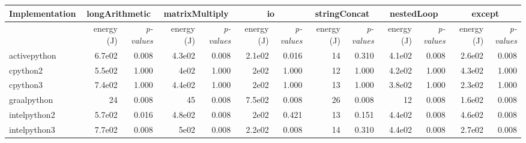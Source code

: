 \begin{table*}
{\begin{tabular}{l|rr|rr|rr|rr|rr|rr}
            Implementation & \multicolumn{2}{c}{longArithmetic} & \multicolumn{2}{c}{matrixMultiply} & \multicolumn{2}{c}{io} & \multicolumn{2}{c}{stringConcat} & \multicolumn{2}{c}{nestedLoop} & \multicolumn{2}{c}{except}                                                                                     \\
            \midrule
                           & energy (J)                         & \em p-values                       & energy (J)             & \em p-values                     & energy (J)                     & \em p-values               & energy (J) & \em p-values & energy (J) & \em p-values & energy (J) & \em p-values \\
            activepython   & 6.7e02                             & 0.008                              & 4.3e02                 & 0.008                            & 2.1e02                         & 0.016                      & 14         & 0.310        & 4.1e02     & 0.008        & 2.6e02     & 0.008        \\
            cpython2       & 5.5e02                             & 1.000                              & 4e02                   & 1.000                            & 2e02                           & 1.000                      & 12         & 1.000        & 4.2e02     & 1.000        & 4.3e02     & 1.000        \\
            cpython3       & 7.4e02                             & 1.000                              & 4.4e02                 & 1.000                            & 2e02                           & 1.000                      & 13         & 1.000        & 3.8e02     & 1.000        & 2.3e02     & 1.000        \\
            graalpython    & 24                                 & 0.008                              & 45                     & 0.008                            & 7.5e02                         & 0.008                      & 26         & 0.008        & 12         & 0.008        & 1.6e02     & 0.008        \\
            intelpython2   & 5.7e02                             & 0.016                              & 4.8e02                 & 0.008                            & 2e02                           & 0.421                      & 13         & 0.151        & 4.4e02     & 0.008        & 4.6e02     & 0.008        \\
            intelpython3   & 7.7e02                             & 0.008                              & 5e02                   & 0.008                            & 2.2e02                         & 0.008                      & 14         & 0.310        & 4.4e02     & 0.008        & 2.7e02     & 0.008        \\

\end{tabular}}
\end{table*}

